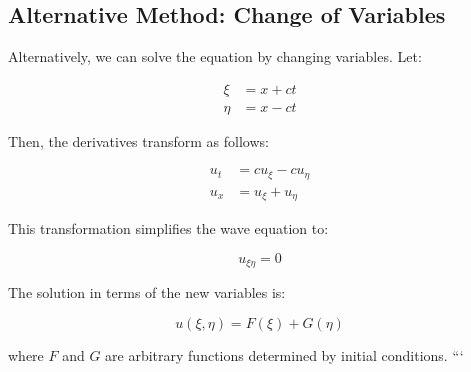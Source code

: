 \subsection*{Alternative Method: Change of Variables}

Alternatively, we can solve the equation by changing variables. Let:

\begin{align}
    \xi &= x + ct \\
    \eta &= x - ct
\end{align}

Then, the derivatives transform as follows:

\begin{align}
    u_t &= c u_\xi - c u_\eta \\
    u_x &= u_\xi + u_\eta
\end{align}

This transformation simplifies the wave equation to:

\begin{equation}
    u_{\xi \eta} = 0
\end{equation}

The solution in terms of the new variables is:

\begin{equation}
    u(\xi, \eta) = F(\xi) + G(\eta)
\end{equation}

where \( F \) and \( G \) are arbitrary functions determined by initial conditions.
```
